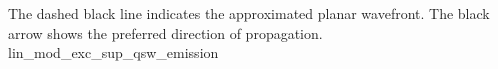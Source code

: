 { %
 The dashed black line indicates
 the approximated planar wavefront.
 The black arrow shows
 the preferred direction of
 propagation.
}%
{lin_mod_exc_sup_qsw_emission}

